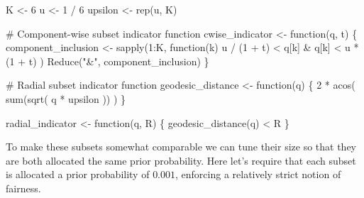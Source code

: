 \documentclass[
  letterpaper,
  DIV=11,
  numbers=noendperiod]{scrartcl}
\newenvironment{Shaded}{\begin{snugshade}}{\end{snugshade}}
\newcommand{\CommentTok}[1]{\textcolor[rgb]{0.37,0.37,0.37}{#1}}
\newcommand{\ControlFlowTok}[1]{\textcolor[rgb]{0.00,0.23,0.31}{#1}}
\newcommand{\DecValTok}[1]{\textcolor[rgb]{0.68,0.00,0.00}{#1}}
\newcommand{\FunctionTok}[1]{\textcolor[rgb]{0.28,0.35,0.67}{#1}}
\newcommand{\NormalTok}[1]{\textcolor[rgb]{0.00,0.23,0.31}{#1}}
\newcommand{\OtherTok}[1]{\textcolor[rgb]{0.00,0.23,0.31}{#1}}
\newcommand{\SpecialCharTok}[1]{\textcolor[rgb]{0.37,0.37,0.37}{#1}}
\newcommand{\StringTok}[1]{\textcolor[rgb]{0.13,0.47,0.30}{#1}}
\begin{document}
\begin{Shaded}
\begin{Highlighting}[]
\NormalTok{K }\OtherTok{\textless{}{-}} \DecValTok{6}
\NormalTok{u }\OtherTok{\textless{}{-}} \DecValTok{1} \SpecialCharTok{/} \DecValTok{6}
\NormalTok{upsilon }\OtherTok{\textless{}{-}} \FunctionTok{rep}\NormalTok{(u, K)}

\CommentTok{\# Component{-}wise subset indicator function}
\NormalTok{cwise\_indicator }\OtherTok{\textless{}{-}} \ControlFlowTok{function}\NormalTok{(q, t) \{}
\NormalTok{  component\_inclusion }\OtherTok{\textless{}{-}} \FunctionTok{sapply}\NormalTok{(}\DecValTok{1}\SpecialCharTok{:}\NormalTok{K, }\ControlFlowTok{function}\NormalTok{(k) u }\SpecialCharTok{/}\NormalTok{ (}\DecValTok{1} \SpecialCharTok{+}\NormalTok{ t) }\SpecialCharTok{\textless{}}\NormalTok{ q[k] }\SpecialCharTok{\&}
\NormalTok{                                                 q[k] }\SpecialCharTok{\textless{}}\NormalTok{ u }\SpecialCharTok{*}\NormalTok{ (}\DecValTok{1} \SpecialCharTok{+}\NormalTok{ t) )}
  \FunctionTok{Reduce}\NormalTok{(}\StringTok{"\&"}\NormalTok{, component\_inclusion)}
\NormalTok{\}}

\CommentTok{\# Radial subset indicator function}
\NormalTok{geodesic\_distance }\OtherTok{\textless{}{-}} \ControlFlowTok{function}\NormalTok{(q) \{}
  \DecValTok{2} \SpecialCharTok{*} \FunctionTok{acos}\NormalTok{( }\FunctionTok{sum}\NormalTok{(}\FunctionTok{sqrt}\NormalTok{( q }\SpecialCharTok{*}\NormalTok{ upsilon )) )}
\NormalTok{\}}

\NormalTok{radial\_indicator }\OtherTok{\textless{}{-}} \ControlFlowTok{function}\NormalTok{(q, R) \{}
  \FunctionTok{geodesic\_distance}\NormalTok{(q) }\SpecialCharTok{\textless{}}\NormalTok{ R}
\NormalTok{\}}
\end{Highlighting}
\end{Shaded}

To make these subsets somewhat comparable we can tune their size so that
they are both allocated the same prior probability. Here let's require
that each subset is allocated a prior probability of \(0.001\),
enforcing a relatively strict notion of fairness.
\end{document}
